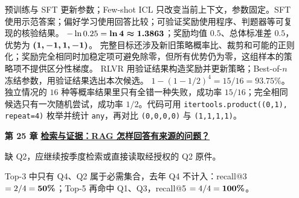 \begin{enumerate}[leftmargin=5.4em,labelsep=.7em,itemsep=9pt]
预训练与 SFT 更新参数；Few-shot ICL 只改变当前上下文，参数固定。SFT 使用示范答案；偏好学习使用回答比较；可验证奖励使用程序、判题器等可复现的核验结果。
$-\ln0.25=\answerresult{\ln4\approx1.3863}$；奖励均值 $0.5$、总体标准差 $0.5$，优势为 $\answerresult{(1,-1,1,-1)}$。
完整目标还涉及新旧策略概率比、裁剪和可能的正则化；奖励完全相同时加稳定项可避免除零，但所有优势仍为零，这组样本的策略项不提供区分性梯度。
RLVR 用验证结果构造奖励并更新策略；Best-of-$n$ 冻结参数，用验证结果选出本次候选。
$1-(1-1/2)^4=15/16=93.75\%$。
独立情况的 $16$ 种等概率结果里只有全错一种失败，成功率 $15/16$；完全相同候选只有一次随机尝试，成功率 $1/2$。代码可用 \texttt{itertools.product((0,1), repeat=4)} 枚举并统计 \texttt{any}，再对比 \texttt{(0,0,0,0)} 与 \texttt{(1,1,1,1)}。
\par{}
\item[\textbf{第 25 章}] \label{answer:rag}\textbf{\hyperref[check:rag]{检索与证据：RAG 怎样回答有来源的问题？}}\par\nobreak
{}
缺 Q2，应继续按季度检索或直接读取经授权的 Q2 原件。
\par{}Top-3 中只有 Q4、Q2 属于必需集合，去年 Q4 不计入：recall@3 $=2/4=\boldsymbol{50\%}$；Top-5 再命中 Q1、Q3，recall@5 $=4/4=\boldsymbol{100\%}$。

\end{enumerate}
